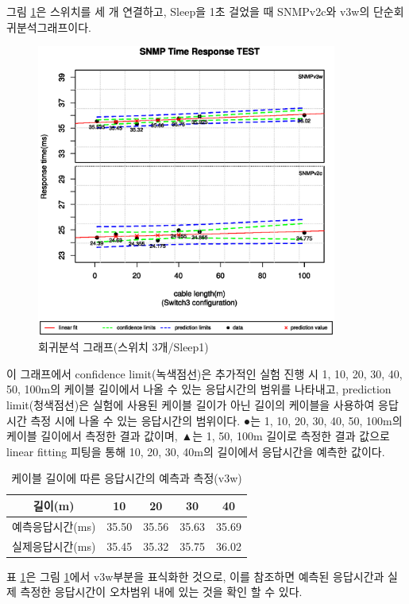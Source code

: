 \documentclass[11pt
  , a4paper
  , article
  , oneside
]{memoir}
\begin{document}
그림 \ref{fig:s3s1}은 스위치를 세 개 연결하고, Sleep을 1초 걸었을 때 SNMPv2c와 v3w의 단순회귀분석그래프이다. 

\begin{figure}[!htb]
  \centering
  \includegraphics[width=0.88\textwidth]{./images/s3s1.eps}
  \caption{회귀분석 그래프(스위치 3개/Sleep1)}
  \label{fig:s3s1}   
\end{figure}

이 그래프에서 confidence limit(녹색점선)은 추가적인 실험 진행 시 1, 10, 20, 30, 40, 50, 100m의 케이블 길이에서 나올 수 있는 응답시간의 범위를 나타내고, prediction limit(청색점선)은 실험에 사용된 케이블 길이가 아닌 길이의 케이블을 사용하여 응답시간 측정 시에 나올 수 있는 응답시간의 범위이다. ●는 1, 10, 20, 30, 40, 50, 100m의 케이블 길이에서 측정한 결과 값이며, ▲는 1, 50, 100m 길이로 측정한 결과 값으로 linear fitting 피팅을 통해 10, 20, 30, 40m의 길이에서 응답시간을 예측한 값이다. 

\begin{table}[!htb]
\begin{center}
\begin{tabular}{c|c|c|c|c}\hline
길이(m) & 10 & 20 & 30 & 40 \\ \hline
예측응답시간(ms)& 35.50 & 35.56 & 35.63 & 35.69 \\ \hline
실제응답시간(ms)& 35.45 & 35.32 & 35.75 & 36.02 \\ \hline
\end{tabular}
\caption{케이블 길이에 따른 응답시간의 예측과 측정(v3w)}
  \label{table:predict_time}  
\end{center}
\end{table} 
표 \ref{table:predict_time}은 그림 \ref{fig:s3s1}에서 v3w부분을 표식화한 것으로, 이를 참조하면 예측된 응답시간과 실제 측정한 응답시간이 오차범위 내에 있는 것을 확인 할 수 있다.
 
\end{document}
